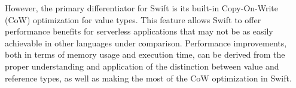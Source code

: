 However, the primary differentiator for Swift is its built-in Copy-On-Write (CoW) optimization for value types. This feature allows Swift to offer performance benefits for serverless applications that may not be as easily achievable in other languages under comparison. Performance improvements, both in terms of memory usage and execution time, can be derived from the proper understanding and application of the distinction between value and reference types, as well as making the most of the CoW optimization in Swift.
